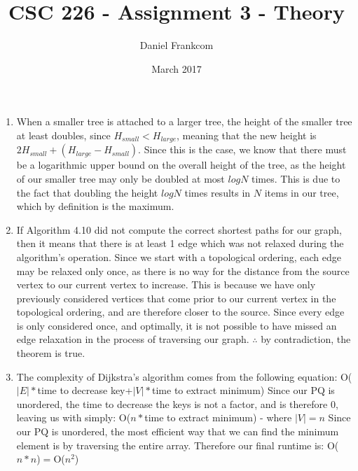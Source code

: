 \documentclass{article}
\title{CSC 226 - Assignment 3 - Theory}
\date{March 2017}
\author{Daniel Frankcom}
\begin{document}
	\maketitle
	\setlength{\parindent}{0pt}
	\newcommand{\forceindent}{\leavevmode{\parindent=72pt\indent}}
	\newpage
	
	\begin{enumerate}
		\item When a smaller tree is attached to a larger tree, the height of the smaller tree at least doubles, since $H_{small}<H_{large}$, meaning that the new height is $2H_{small}+(H_{large}-H_{small})$.
		\newline Since this is the case, we know that there must be a logarithmic upper bound on the overall height of the tree, as the height of our smaller tree may only be doubled at most $logN$ times. This is due to the fact that doubling the height $logN$ times results in $N$ items in our tree, which by definition is the maximum.
		
		\item If Algorithm 4.10 did not compute the correct shortest paths for our graph, then it means that there is at least 1 edge which was not relaxed during the algorithm's operation.
		\newline Since we start with a topological ordering, each edge may be relaxed only once, as there is no way for the distance from the source vertex to our current vertex to increase. This is because we have only previously considered vertices that come prior to our current vertex in the topological ordering, and are therefore closer to the source.
		\newline Since every edge is only considered once, and optimally, it is not possible to have missed an edge relaxation in the process of traversing our graph.
		\newline $\therefore$ by contradiction, the theorem is true.
		
		\item The complexity of Dijkstra's algorithm comes from the following equation:
		\newline O($|E|*$time to decrease key+$|V|*$time to extract minimum)
		\newline Since our PQ is unordered, the time to decrease the keys is not a factor, and is therefore 0, leaving us with simply:
		\newline O($n*$time to extract minimum) - where $|V|=n$
		\newline Since our PQ is unordered, the most efficient way that we can find the minimum element is by traversing the entire array. Therefore our final runtime is:
		\newline O($n*n$)$=$O($n^2$)
		

\end{enumerate}
\end{document}
